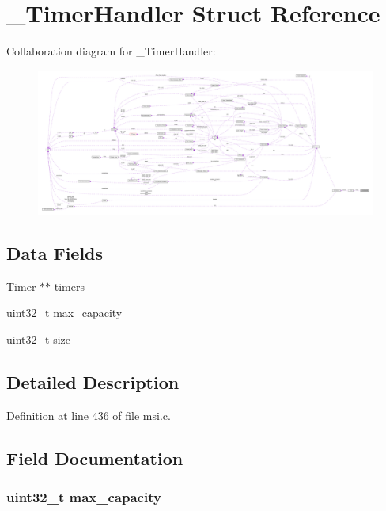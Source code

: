 \hypertarget{struct___timer_handler}{\section{\+\_\+\+Timer\+Handler Struct Reference}
\label{struct___timer_handler}
}


Collaboration diagram for \+\_\+\+Timer\+Handler\+:
\nopagebreak
\begin{figure}[H]
\begin{center}
\leavevmode
\includegraphics[width=350pt]{d6/d46/struct___timer_handler__coll__graph}
\end{center}
\end{figure}
\subsection*{Data Fields}
\begin{DoxyCompactItemize}
\item 
\hyperlink{msi_8c_a331ddf64cc0ad62ea466e7cc2d010a5c}{Timer} $\ast$$\ast$ \hyperlink{struct___timer_handler_af6a69553fb8462326147c121a4c3e98c}{timers}
\item 
uint32\+\_\+t \hyperlink{struct___timer_handler_a75d656828e87eb82559cb02fa2219d98}{max\+\_\+capacity}
\item 
uint32\+\_\+t \hyperlink{struct___timer_handler_ab2c6b258f02add8fdf4cfc7c371dd772}{size}
\end{DoxyCompactItemize}


\subsection{Detailed Description}


Definition at line 436 of file msi.\+c.



\subsection{Field Documentation}
\hypertarget{struct___timer_handler_a75d656828e87eb82559cb02fa2219d98}{
\subsubsection[{max\+\_\+capacity}]{\setlength{\rightskip}{0pt plus 5cm}uint32\+\_\+t max\+\_\+capacity}}\label{struct___timer_handler_a75d656828e87eb82559cb02fa2219d98}


